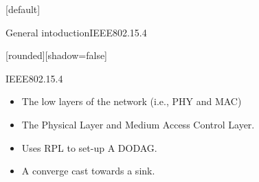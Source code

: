 \documentclass{beamer}
\makeatletter
\newenvironment{withoutheadline}{
        \setbeamertemplate{headline}[default]
        \def\beamer@entrycode{\vspace*{-\headheight}}
    }{}
\makeatother
\begin{document}
\begin{withoutheadline}
\begin{frame}{General intoduction}{IEEE802.15.4}

[rounded][shadow=false]


\begin{minipage}[t]{0.48\linewidth}

\begin{block}{IEEE802.15.4}
    \begin{itemize}
    \item The low layers of the network (i.e., PHY and MAC) 
    \item<2-> The Physical Layer and Medium Access Control Layer.
    
    \item<3-> Uses RPL to set-up A DODAG.
    \item<4-> A converge cast towards a sink. 
    
    \end{itemize}
    \end{block}
\end{minipage}\hfill
\begin{minipage}[t]{0.48\linewidth}
\centering
 \begin{figure}[p]


\end{figure}
\end{minipage}
\end{frame}
\end{withoutheadline}
\end{document}
